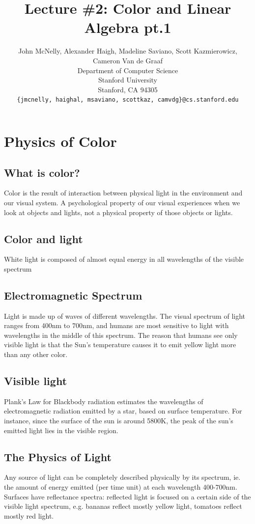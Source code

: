 \documentclass{article}
\title{Lecture \#2: Color and Linear Algebra pt.1}
\author{
  John McNelly, Alexander Haigh, Madeline Saviano, Scott Kazmierowicz, Cameron Van de Graaf \\
  Department of Computer Science\\
  Stanford University\\
  Stanford, CA 94305 \\
  \texttt{\{jmcnelly, haighal, msaviano, scottkaz, camvdg\}@cs.stanford.edu} \\
}
\begin{document}
\maketitle

\section{Physics of Color}
\subsection{What is color?}
Color is the result of interaction between physical light in the environment and our visual system.  A psychological property of our visual experiences when we look at objects and lights, not a physical property of those objects or lights.  ~\cite{palmer1999vision}


\subsection{Color and light}
White light is composed of almost equal energy in all wavelengths of the visible spectrum

\subsection{Electromagnetic Spectrum}
Light is made up of waves of different wavelengths.  The visual spectrum of light ranges from 400nm to 700nm, and humans are most sensitive to light with wavelengths in the middle of this spectrum.  The reason that humans see only visible light is that the Sun's temperature causes it to emit yellow light more than any other color.

\subsection{Visible light}
Plank's Law for Blackbody radiation estimates the wavelengths of electromagnetic radiation emitted by a star, based on surface temperature.  For instance, since the surface of the sun is around 5800K, the peak of the sun's emitted light lies in the visible region.

\subsection{The Physics of Light}
Any source of light can be completely described physically by its spectrum, ie. the amount of energy emitted (per time unit) at each wavelength 400-700nm.  Surfaces have reflectance spectra: reflected light is focused on a certain side of the visible light spectrum, e.g. bananas reflect mostly yellow light, tomatoes reflect mostly red light.
\end{document}
